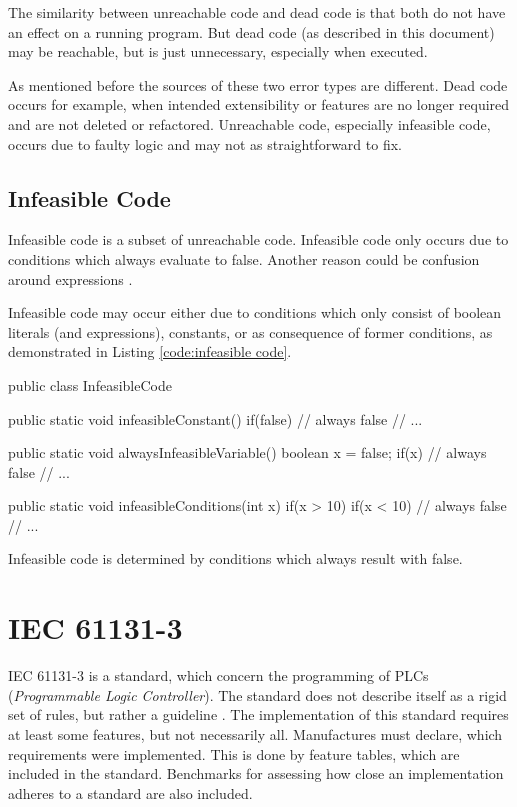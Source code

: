 The similarity between unreachable code and dead code is that both do not have an effect on a running program. But dead code (as described in this document) may be reachable, but is just unnecessary, especially when executed. 


As mentioned before the sources of these two error types are different.
Dead code occurs for example, when intended extensibility or features are no longer required and are not deleted or refactored.
Unreachable code, especially infeasible code, occurs due to faulty logic and may not as straightforward to fix.
\subsection{Infeasible Code}
\label{sub:infeasible code}
Infeasible code is a subset of unreachable code.
Infeasible code only occurs due to conditions which always evaluate to false. Another reason could be confusion around expressions \cite{Eichberg_2015}.


Infeasible code may occur either due to conditions which only consist of boolean literals (and expressions), constants, or as consequence of former conditions, as demonstrated in Listing \ref{code:infeasible code}.


\begin{program}[h!]
	\begin{JavaCode}
		public class InfeasibleCode {
			public static void infeasibleConstant() {
				if(false) {
					// always false
					// ...
				}
			}
			
			public static void alwaysInfeasibleVariable() {
				boolean x = false;
				if(x) {
					// always false
					// ...
				}
			}
			
			public static void infeasibleConditions(int x) {
				if(x > 10) {
					if(x < 10) {
						// always false
						// ...
					}
				}
			}
	}\end{JavaCode}
	\caption{Infeasible code is determined by conditions which always result with false. }
	\label{code:infeasible code}
\end{program}

\section{IEC 61131-3}
\label{sec:iec}

IEC 61131-3 is a standard, which concern the programming of PLCs (\emph{Programmable Logic Controller}). The standard does not describe itself as a rigid set of rules, but rather a guideline \cite{johnIEC611313Programming2010}. The implementation of this standard requires at least some features, but not necessarily all. Manufactures must declare, which requirements were implemented. This is done by feature tables, which are included in the standard. Benchmarks for assessing how close an implementation adheres to a standard are also included.


